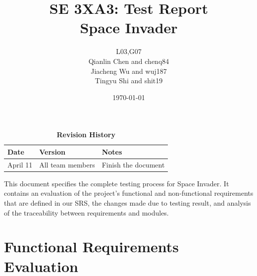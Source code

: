 \documentclass[12pt, titlepage]{article}
\title{SE 3XA3: Test Report\\Space Invader}
\author{L03,G07
		\\ Qianlin Chen and chenq84
		\\ Jiacheng Wu and wuj187
		\\ Tingyu Shi and shit19
}
\date{\today}
\begin{document}
\maketitle

\tableofcontents
\listoftables

\newpage
\begin{table}[htb]
\caption{\bf Revision History}
\begin{tabularx}{\textwidth}{p{3cm}p{2cm}X}
\toprule {\bf Date} & {\bf Version} & {\bf Notes}\\
\midrule
April 11 & All team members & Finish the document\\
\bottomrule
\end{tabularx}
\end{table}

\newpage


\noindent This document specifies the complete testing process for Space Invader. It contains an evaluation of the project's functional and non-functional requirements that are defined in our SRS, the changes made due to testing result, and analysis of the traceability between requirements and modules.

\section{Functional Requirements Evaluation}
\end{document}
